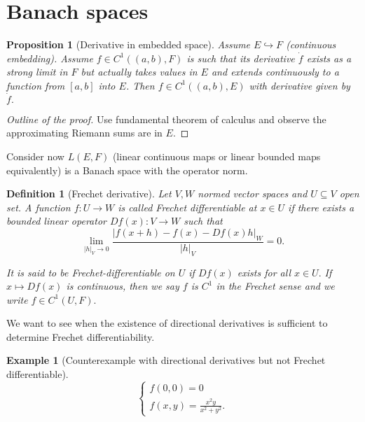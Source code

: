 \documentclass{article}
\newtheorem{definition}{Definition}
\newtheorem{prop}[theorem]{Proposition}
\newtheorem{example}{Example}
\begin{document}
\section{Banach spaces}

\begin{prop}[Derivative in embedded space]
    Assume $E \hookrightarrow F$ (continuous embedding). Assume $f \in C^1((a,b), F)$ is such that its derivative $\dot{f}$ exists as a strong limit in $F$ but actually takes values in $E$ and extends continuously to a function from $[a,b]$ into $E$. Then $f \in C^1((a,b), E)$ with derivative given by $\dot{f}.$
\end{prop}
\begin{proof}[Outline of the proof]
    Use fundamental theorem of calculus and observe the approximating Riemann sums are in $E$.
\end{proof}

Consider now $L(E,F)$ (linear continuous maps or linear bounded maps equivalently) is a Banach space with the operator norm.

\begin{definition}[Frechet derivative]
    Let $V, W$ normed vector spaces and $U \subseteq V$ open set. 
    A function $f:U \rightarrow W$ is called \textit{Frechet differentiable} at $x \in U$ if there exists a
    bounded linear operator $Df(x): V \rightarrow W$ such that
    \begin{equation}
        \lim_{|h|_V \rightarrow 0} \frac{|f(x + h) - f(x) - Df(x) h|_W}{|h|_V} = 0.
    \end{equation}

    It is said to be Frechet-differentiable on $U$ if $Df(x)$ exists for all $x \in U.$
    If $x \mapsto Df(x)$ is continuous, then we say $f$ is $C^1$ in the Frechet sense and we write $f \in C^1(U,F).$
\end{definition}

We want to see when the existence of directional derivatives is sufficient to determine Frechet differentiability.

\begin{example}[Counterexample with directional derivatives but not Frechet differentiable]
    \begin{equation}
        \begin{cases}
            f(0,0) = 0 \\
            f(x,y) = \frac{x^2 y}{x^2 + y^2}. 
        \end{cases}
    \end{equation}
\end{example}
\end{document}
